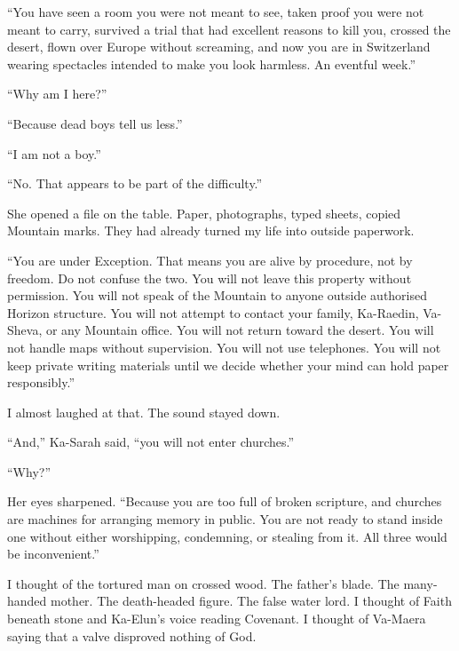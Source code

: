 ``You have seen a room you were not meant to see, taken proof you were not meant to carry, survived a trial that had excellent reasons to kill you, crossed the desert, flown over Europe without screaming, and now you are in Switzerland wearing spectacles intended to make you look harmless. An eventful week.''\par

``Why am I here?''\par

``Because dead boys tell us less.''\par

``I am not a boy.''\par

``No. That appears to be part of the difficulty.''\par

She opened a file on the table. Paper, photographs, typed sheets, copied Mountain marks. They had already turned my life into outside paperwork.\par

``You are under Exception. That means you are alive by procedure, not by freedom. Do not confuse the two. You will not leave this property without permission. You will not speak of the Mountain to anyone outside authorised Horizon structure. You will not attempt to contact your family, Ka-Raedin, Va-Sheva, or any Mountain office. You will not return toward the desert. You will not handle maps without supervision. You will not use telephones. You will not keep private writing materials until we decide whether your mind can hold paper responsibly.''\par

I almost laughed at that. The sound stayed down.\par

``And,'' Ka-Sarah said, ``you will not enter churches.''\par

``Why?''\par

Her eyes sharpened. ``Because you are too full of broken scripture, and churches are machines for arranging memory in public. You are not ready to stand inside one without either worshipping, condemning, or stealing from it. All three would be inconvenient.''\par

I thought of the tortured man on crossed wood. The father's blade. The many-handed mother. The death-headed figure. The false water lord. I thought of Faith beneath stone and Ka-Elun's voice reading Covenant. I thought of Va-Maera saying that a valve disproved nothing of God.\par

